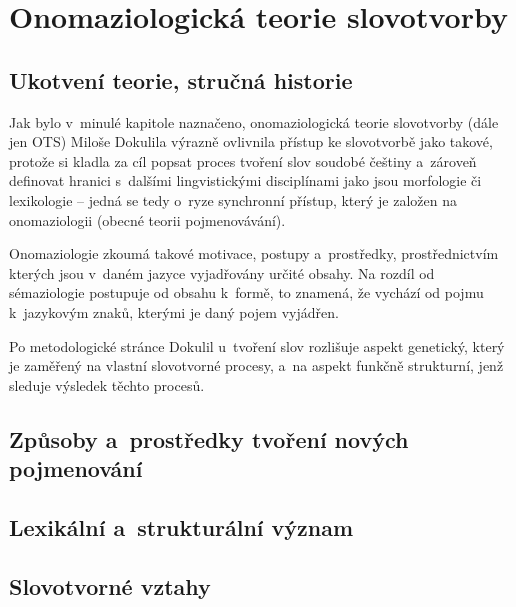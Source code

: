\hypertarget{onomaziologickuxe1-teorie-slovotvorby}{%
\chapter{Onomaziologická teorie
slovotvorby}\label{onomaziologickuxe1-teorie-slovotvorby}}

\hypertarget{ukotvenuxed-teorie-struux10dnuxe1-historie}{%
\section{Ukotvení teorie, stručná
historie}\label{ukotvenuxed-teorie-struux10dnuxe1-historie}}

Jak bylo v~minulé kapitole naznačeno, onomaziologická teorie slovotvorby
(dále jen OTS) Miloše Dokulila výrazně ovlivnila přístup ke slovotvorbě
jako takové, protože si kladla za cíl popsat proces tvoření slov soudobé
češtiny a~zároveň definovat hranici s~dalšími lingvistickými
disciplínami jako jsou morfologie či lexikologie -- jedná se tedy o~ryze
synchronní přístup, který je založen na onomaziologii (obecné teorii
pojmenovávání).~\parencite{enc-ots17}

Onomaziologie zkoumá takové motivace, postupy a~prostředky,
prostřednictvím kterých jsou v~daném jazyce vyjadřovány určité obsahy.
Na rozdíl od sémaziologie postupuje od obsahu k~formě, to znamená, že
vychází od pojmu k~jazykovým znaků, kterými je daný pojem vyjádřen.
\parencite{enc-onomaz17}

Po metodologické stránce Dokulil u~tvoření slov rozlišuje aspekt
genetický, který je zaměřený na vlastní slovotvorné procesy, a~na aspekt
funkčně strukturní, jenž sleduje výsledek těchto procesů.
\parencite[9]{dokulil62}

\hypertarget{zpux16fsoby-a-prostux159edky-tvoux159enuxed-novuxfdch-pojmenovuxe1nuxed}{%
\section{Způsoby a~prostředky tvoření nových
pojmenování}\label{zpux16fsoby-a-prostux159edky-tvoux159enuxed-novuxfdch-pojmenovuxe1nuxed}}

\hypertarget{lexikuxe1lnuxed-a-strukturuxe1lnuxed-vuxfdznam}{%
\section{Lexikální a~strukturální
význam}\label{lexikuxe1lnuxed-a-strukturuxe1lnuxed-vuxfdznam}}

\hypertarget{slovotvornuxe9-vztahy}{%
\section{Slovotvorné vztahy}\label{slovotvornuxe9-vztahy}}

